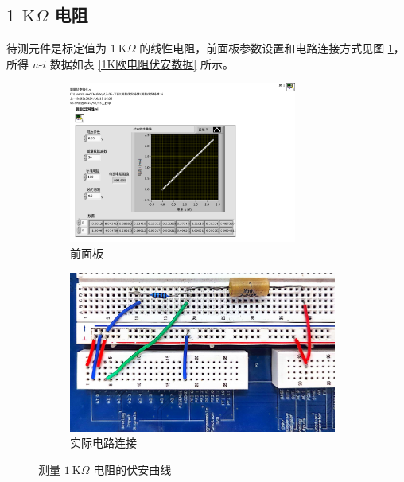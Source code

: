 \documentclass[UTF8]{article}
\def\kO{\ \mathrm{K}\Omega}
\theoremstyle{MyLineTheoremStyle} %
\theoremstyle{MyBlockTheoremStyle} %
\theoremstyle{MySubsubsectionStyle} %
\begin{document}
\subsection{$1\ \kO$ 电阻}

待测元件是标定值为 $1 \kO$ 的线性电阻，前面板参数设置和电路连接方式见图 \ref{测量1K欧电阻的伏安曲线}，所得 $u$-$i$ 数据如表 \ref{1K欧电阻伏安数据} 所示。

\begin{figure}[H]\centering
    \begin{subfigure}[b]{0.45\columnwidth}\centering
        \includegraphics[height=150pt]{assets/测量伏安曲线__1K欧电阻.pdf}
        \caption{前面板}
    \end{subfigure}\hfill
    \begin{subfigure}[b]{0.55\columnwidth}\centering
        \includegraphics[height=150pt]{assets/测量伏安曲线__1K欧电阻.jpg}
        \caption{实际电路连接}
    \end{subfigure}
    \caption{测量 $1 \kO$ 电阻的伏安曲线}
    \label{测量1K欧电阻的伏安曲线}
\end{figure}
\end{document}
